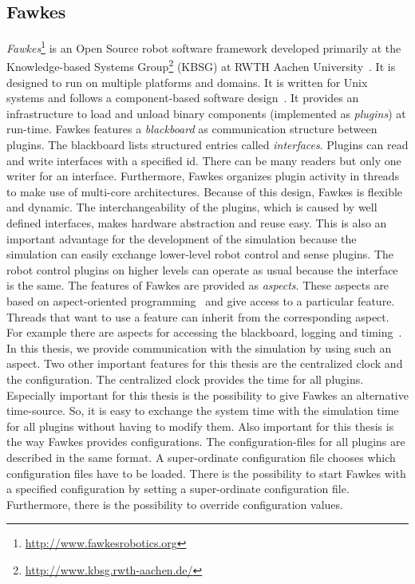 \subsection{Fawkes}
\textit{Fawkes}\footnote{\url{http://www.fawkesrobotics.org}} is an Open Source robot software framework developed primarily at the Knowledge-based Systems Group\footnote{\url{http://www.kbsg.rwth-aachen.de/}} (KBSG) at RWTH Aachen University~\cite{FawkesDesign}. It is designed to run on multiple platforms and domains. It is written for Unix systems and follows a component-based software design~\cite{component}. It provides an infrastructure to load and unload binary components (implemented as \textit{plugins}) at run-time. Fawkes features a \textit{blackboard} as communication structure between plugins. The blackboard lists structured entries called \textit{interfaces}. Plugins can read and write interfaces with a specified id. There can be many readers but only one writer for an interface. Furthermore, Fawkes organizes plugin activity in threads to make use of multi-core architectures. Because of this design, Fawkes is flexible and dynamic. The interchangeability of the plugins, which is caused by well defined interfaces, makes hardware abstraction and reuse easy. This is also an important advantage for the development of the simulation because the simulation can easily exchange lower-level robot control and sense plugins. The robot control plugins on higher levels can operate as usual because the interface is the same. The features of Fawkes are provided as \textit{aspects}. These aspects are based on aspect-oriented programming~\cite{aspect_oriented} and give access to a particular feature. Threads that want to use a feature can inherit from the corresponding aspect. For example there are aspects for accessing the blackboard, logging and timing~\cite{tnthesis}. In this thesis, we provide communication with the simulation by using such an aspect. Two other important features for this thesis are the centralized clock and the configuration. The centralized clock provides the time for all plugins. Especially important for this thesis is the possibility to give Fawkes an alternative time-source. So, it is easy to exchange the system time with the simulation time for all plugins without having to modify them. Also important for this thesis is the way Fawkes provides configurations. The configuration-files for all plugins are described in the same format. A super-ordinate configuration file chooses which configuration files have to be loaded. There is the possibility to start Fawkes with a specified configuration by setting a super-ordinate configuration file. Furthermore, there is the possibility to override configuration values.\\
